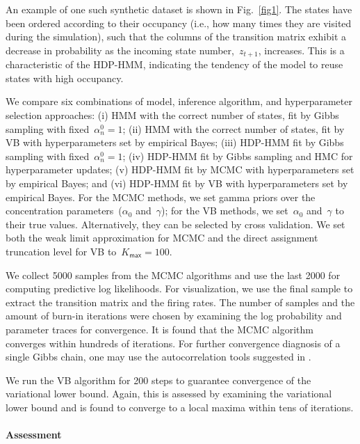  An example of one such synthetic dataset is shown in
 Fig.~\ref{fig1}. The states have been ordered according to their
 occupancy (i.e., how many times they are visited during the
 simulation), such that the columns of the transition matrix exhibit a
 decrease in probability as the incoming state number,~$z_{t+1}$,
 increases. This is a characteristic of the HDP-HMM, indicating the
 tendency of the model to reuse states with high occupancy.

We compare six combinations of model, inference algorithm, and
hyperparameter selection approaches: (i) HMM with the correct number
of states, fit by Gibbs sampling with fixed~$\alpha_n^0=1$; (ii) HMM
with the correct number of states, fit by VB with hyperparameters set
by empirical Bayes; (iii) HDP-HMM fit by Gibbs sampling with
fixed~$\alpha_n^0=1$; (iv) HDP-HMM fit by Gibbs sampling and HMC for
hyperparameter updates; (v) HDP-HMM fit by MCMC with hyperparameters
set by empirical Bayes; and (vi) HDP-HMM fit by VB with
hyperparameters set by empirical Bayes. For the MCMC methods, we set
gamma priors over the concentration parameters~($\alpha_0$
and~$\gamma$); for the VB methods, we set~$\alpha_0$ and~$\gamma$ to
their true values. Alternatively, they can be selected by cross
validation. We set both the weak limit approximation for MCMC and the
direct assignment truncation level for VB to~${K_{\mathsf{max}}=100}$.

We collect 5000 samples from the MCMC algorithms and use the last 2000
for computing predictive log likelihoods. For visualization, we use
the final sample to extract the transition matrix and the firing
rates. The number of samples and the amount of burn-in iterations were
chosen by examining the log probability and parameter traces for
convergence. It is found that the MCMC algorithm converges within
hundreds of iterations. For further convergence diagnosis of a single
Gibbs chain, one may use the autocorrelation tools suggested in
\citep{RafteryLewis92,Cowles96}.

We run the VB algorithm for 200 steps to guarantee convergence of the
variational lower bound. Again, this is assessed by examining the
variational lower bound and is found to converge to a local maxima
within tens of iterations.


\paragraph{Assessment} 

